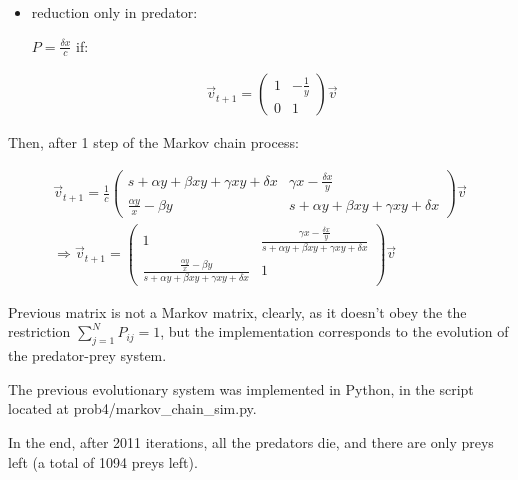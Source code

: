 \documentclass[paper=a4, fontsize=11pt]{scrartcl} %
\numberwithin{equation}{section} %
\numberwithin{figure}{section} %
\numberwithin{table}{section} %
\begin{document}
\begin{itemize}
\begin{itemize}
\item reduction only in predator:

$P = \frac{\delta x}{c}$ if:

\begin{equation}
\begin{split}
\vec{v}_{t+1} = \left(\begin{array}{cc} 1 & -\frac{1}{y}\\ 0 & 1 \end{array}\right) \vec{v}
\end{split}
\label{eq:predator_prey6}
\end{equation}


\end{itemize}

Then, after 1 step of the Markov chain process:

\begin{equation}
\begin{split}
\vec{v}_{t+1} = \frac{1}{c} \left(\begin{array}{cc} s+\alpha y + \beta xy+ \gamma xy + \delta x & \gamma x-\frac{\delta x}{y} \\ \frac{\alpha y}{x} - \beta y & s+\alpha y + \beta xy+ \gamma xy + \delta x \end{array}\right) \vec{v} \\
\Rightarrow \vec{v}_{t+1} = \left(\begin{array}{cc} 1 & \frac{\gamma x-\frac{\delta x}{y}}{s+\alpha y + \beta xy+ \gamma xy + \delta x} \\ \frac{\frac{\alpha y}{x} - \beta y}{s+\alpha y + \beta xy+ \gamma xy + \delta x} & 1 \end{array}\right) \vec{v}
\end{split}
\label{eq:predator_prey7}
\end{equation}

Previous matrix is not a Markov matrix, clearly, as it doesn't obey the the restriction $\sum_{j=1}^{N}P_{ij} = 1$, but the implementation corresponds to the evolution of the predator-prey system.

The previous evolutionary system was implemented in Python, in the script located at prob4/markov\_chain\_sim.py.

In the end, after 2011 iterations, all the predators die, and there are only preys left (a total of 1094 preys left).

\end{itemize}
\end{document}
